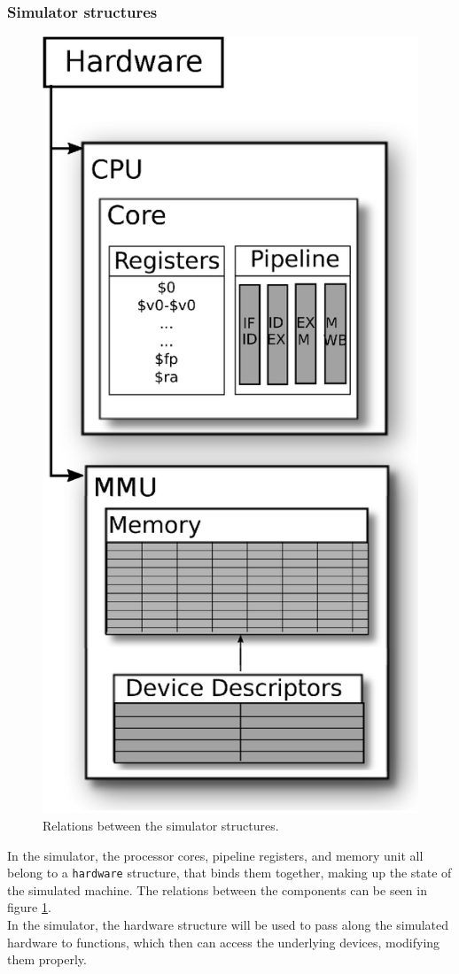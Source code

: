 \subsubsection{Simulator structures}
\begin{figure}[H]
	\centering
	\includegraphics[scale=0.55]{pipeline/structure_layout.eps}
	\caption{Relations between the simulator structures.}
	\label{fig:structure_layout}
\end{figure}
In the simulator, the processor cores, pipeline registers, and memory unit all
belong to a \texttt{hardware} structure, that binds them together, making up the state
of the simulated machine. The relations between the components can be seen in figure
\ref{fig:structure_layout}.\\
In the simulator, the hardware structure will be used to pass along the
simulated hardware to functions, which then can access the underlying devices,
modifying them properly.


